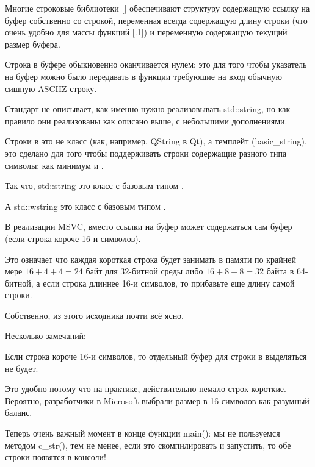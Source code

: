 \label{std_string}


Многие строковые библиотеки [] обеспечивают структуру содержащую ссылку 
на буфер собственно со строкой, переменная всегда содержащую длину строки 
(что очень удобно для массы функций [.1]) и переменную содержащую текущий размер буфера.

Строка в буфере обыкновенно оканчивается нулем: это для того чтобы указатель на буфер можно было
передавать в функции требующие на вход обычную сишную \ac{ASCIIZ}-строку.

Стандарт \Cpp не описывает, как именно нужно реализовывать std::string,
но как правило они реализованы как описано выше, с небольшими дополнениями.

Строки в \Cpp это не класс (как, например, QString в Qt), а темплейт (basic\_string), 
это сделано для того чтобы поддерживать 
строки содержащие разного типа символы: как минимум \Tchar и .

Так что, std::string это класс с базовым типом \Tchar.

А std::wstring это класс с базовым типом .


В реализации MSVC, вместо ссылки на буфер может содержаться сам буфер (если строка короче 16-и символов).

Это означает что каждая короткая строка будет занимать в памяти по крайней мере $16 + 4 + 4 = 24$ 
байт для 32-битной среды либо $16 + 8 + 8 = 32$ 
байта в 64-битной, а если строка длиннее 16-и символов, то прибавьте еще длину самой строки.



Собственно, из этого исходника почти всё ясно.

Несколько замечаний:

Если строка короче 16-и символов, 
то отдельный буфер для строки в  выделяться не будет.

Это удобно потому что на практике, действительно немало строк короткие.
Вероятно, разработчики в Microsoft выбрали размер в 16 символов как разумный баланс.

Теперь очень важный момент в конце функции main(): мы не пользуемся методом c\_str(), тем не менее,
если это скомпилировать и запустить, то обе строки появятся в консоли!

